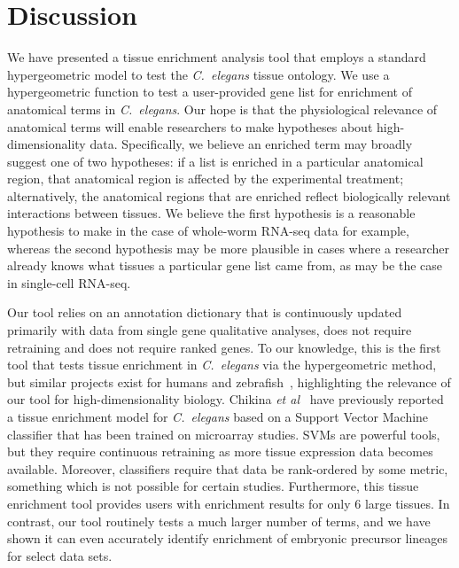 \documentclass{bmcart}
\begin{document}
\section*{Discussion}
We have presented a tissue enrichment analysis tool that employs a standard hypergeometric model to test the \emph{C.~elegans} tissue ontology. We use a hypergeometric function to test a user-provided gene list for enrichment of anatomical terms in \emph{C.~elegans}. Our hope is that the physiological relevance of anatomical terms will enable researchers to make hypotheses about high-dimensionality data. Specifically, we believe an enriched term may broadly suggest one of two hypotheses: if a list is enriched in a particular anatomical region, that anatomical region is affected by the experimental treatment; alternatively, the anatomical regions that are enriched reflect biologically relevant interactions between tissues. We believe the first hypothesis is a reasonable hypothesis to make in the case of whole-worm RNA-seq data for example, whereas the second hypothesis may be more plausible in cases where a researcher already knows what tissues a particular gene list came from, as may be the case in single-cell RNA-seq. 

Our tool relies on an annotation dictionary that is continuously updated primarily with data from single gene qualitative analyses, does not require retraining and does not require ranked genes. To our knowledge, this is the first tool that tests tissue enrichment  in \emph{C.~elegans} via the hypergeometric method, but similar projects exist for humans and zebrafish~\cite{Lee2013, Prykhozhij2013}, highlighting the relevance of our tool for high-dimensionality biology. Chikina \emph{et al}~\cite{Chikina2009} have previously reported a tissue enrichment model for \emph{C.~elegans }based on a Support Vector Machine classifier that has been trained on microarray studies. SVMs are powerful tools, but they require continuous retraining as more tissue expression data becomes available. Moreover, classifiers require that data be rank-ordered by some metric, something which is not possible for certain studies. Furthermore, this tissue enrichment tool provides users with enrichment results for only 6 large tissues. In contrast, our tool routinely tests a much larger number of terms, and we have shown it can even accurately identify enrichment of embryonic precursor lineages for select data sets. 
\end{document}
